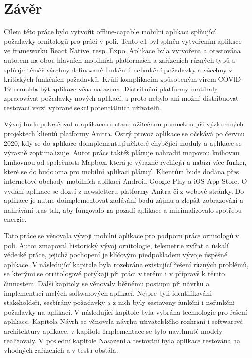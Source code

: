\chapter*{Závěr}

Cílem této práce bylo vytvořit offline-capable mobilní aplikaci splňující požadavky ornitologů pro práci v poli. Tento cíl byl splněn vytvořením aplikace ve frameworku React Native, resp. Expo. Aplikace byla vytvořena a otestována autorem na obou hlavních mobilních platformách a zařízeních různých typů a splňuje téměř všechny definované funkční i nefunkční požadavky a všechny z kritických funkčních požadavků. Kvůli komplikacím způsobeným virem COVID-19 nemohla být aplikace včas nasazena. Distribuční platformy nestíhaly zpracovávat požadavky nových aplikací, a proto nebylo ani možné distribuovat testovací verzi vybrané sekci potenciálních uživatelů. 

Vývoj bude pokračovat a aplikace se stane užitečnou pomůckou při výzkumných projektech klientů platformy Anitra. Ostrý provoz aplikace se očekává po červnu 2020, kdy se do aplikace doimplementují některé chybějící moduly a aplikace se výrazně zoptimalizuje. Autor práce taktéž plánuje nahradit mapovou knihovnu knihovnou od společnosti Mapbox, která je výrazně rychlejší a nabízí více funkcí, které se do budoucna pro mobilní aplikaci plánují. Klientům bude dodána přes internetové obchody mobilních aplikací Android Google Play a iOS App Store. O vydání aplikace se dozví z newsletteru platformy Anitra či z webové stránky. Do aplikace je nutno doimplementovat zadávání bodů zájmu a zlepšit zobrazování a nahrávání tras tak, aby fungovalo na pozadí aplikace a minimalizovalo spotřebu energie.

Tato práce se věnovala vývoji mobilní aplikace pro podporu práce ornitologů v poli. Autor zmapoval historický vývoj ornitologie, telemetrie zvířat a úskalí vědecké práce, jejichž pochopení je klíčovým předpokladem vývoje úspěšné aplikace. V následující kapitole byla rozebrána existující řešení různých problémů, se kterými se ornitologové potýkají při práci v terénu i v přípravě k těmto činnostem. Další kapitoly se věnovaly běžnému postupu při návrhu a implementaci malých softwarových aplikací. Nejpre byli identifikováni stakeholdeři, sesbírány požadavky a z nich byly sestaveny funkční i nefunkční požadavky na aplikaci. V následující kapitole byla vybrána technologie pro řešení aplikace. Kapitola Návrh se věnovala návrhu uživatelského rozhraní i softwarové architektury aplikace, v kapitole Implementace se tyto navrhnuté modely realizovaly. V poslední kapitole Nasazení a testování byla aplikace testována na vhodných zařízeních a v testu obstála.